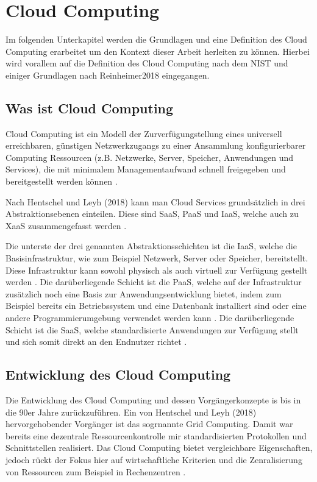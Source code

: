 \section{Cloud Computing}

Im folgenden Unterkapitel werden die Grundlagen und eine Definition des Cloud Computing erarbeitet um den Kontext dieser Arbeit herleiten zu können.
Hierbei wird vorallem auf die Definition des Cloud Computing nach dem NIST und einiger Grundlagen nach Reinheimer2018 eingegangen.

\subsection{Was ist Cloud Computing}

Cloud Computing ist ein Modell der Zurverfügungstellung eines universell erreichbaren,
günstigen Netzwerkzugangs zu einer Ansammlung konfigurierbarer Computing Ressourcen
(z.B. Netzwerke, Server, Speicher, Anwendungen und Services), die mit minimalem Managementaufwand schnell freigegeben und bereitgestellt werden können
\cite[Vgl.][S. 2]{Mell2011}.

Nach Hentschel und Leyh (2018) kann man Cloud Services grundsätzlich in drei Abstraktionsebenen einteilen. Diese sind \acf{SaaS},
\acf{PaaS} und \acf{IaaS}, welche auch zu \acf{XaaS} zusammengefasst werden
\cite[Vgl.][S. 9]{Reinheimer2018}.

Die unterste der drei genannten Abstraktionsschichten ist die \acf{IaaS}, welche die Basisinfrastruktur, wie zum Beispiel Netzwerk, Server oder Speicher,
bereitstellt. Diese Infrastruktur kann sowohl physisch als auch virtuell zur Verfügung gestellt werden \cite[Vgl.][S. 9f]{Reinheimer2018}.
Die darüberliegende Schicht ist die \acf{PaaS}, welche auf der Infrastruktur zusätzlich noch eine Basis zur Anwendungsentwicklung bietet, indem zum Beispiel
bereits ein Betriebssystem und eine Datenbank installiert sind oder eine andere Programmierumgebung verwendet werden kann \cite[Vgl.][S. 10]{Reinheimer2018}.
Die darüberliegende Schicht ist die \acf{SaaS}, welche standardisierte Anwendungen zur Verfügung stellt und sich somit direkt an den Endnutzer richtet
\cite[Vgl.][S. 11]{Reinheimer2018}.

\subsection{Entwicklung des Cloud Computing}

Die Entwicklung des Cloud Computing und dessen Vorgängerkonzepte is bis in die 90er Jahre zurückzuführen.
Ein von Hentschel und Leyh (2018) hervorgehobender Vorgänger ist das sogrnannte Grid Computing.
Damit war bereits eine dezentrale Ressourcenkontrolle mir standardisierten Protokollen und
Schnittstellen realisiert. Das Cloud Computing bietet vergleichbare Eigenschaften, jedoch rückt der
Fokus hier auf wirtschaftliche Kriterien und die Zenralisierung von Ressourcen zum Beispiel in
Rechenzentren \cite[Vgl.][S. 5f]{Reinheimer2018}.


